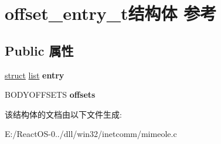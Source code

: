 \hypertarget{structoffset__entry__t}{}\section{offset\+\_\+entry\+\_\+t结构体 参考}
\label{structoffset__entry__t}
\subsection*{Public 属性}
\begin{DoxyCompactItemize}
\item 
\mbox{\label{structoffset__entry__t_a635cdff992ece060d18492963962bea2}} 
\hyperlink{interfacestruct}{struct} \hyperlink{classlist}{list} {\bfseries entry}
\item 
\mbox{\label{structoffset__entry__t_a145e72c4c8a92caf67328c3f794e646f}} 
B\+O\+D\+Y\+O\+F\+F\+S\+E\+TS {\bfseries offsets}
\end{DoxyCompactItemize}


该结构体的文档由以下文件生成\+:\begin{DoxyCompactItemize}
\item 
E\+:/\+React\+O\+S-\/0../dll/win32/inetcomm/mimeole.\+c\end{DoxyCompactItemize}
